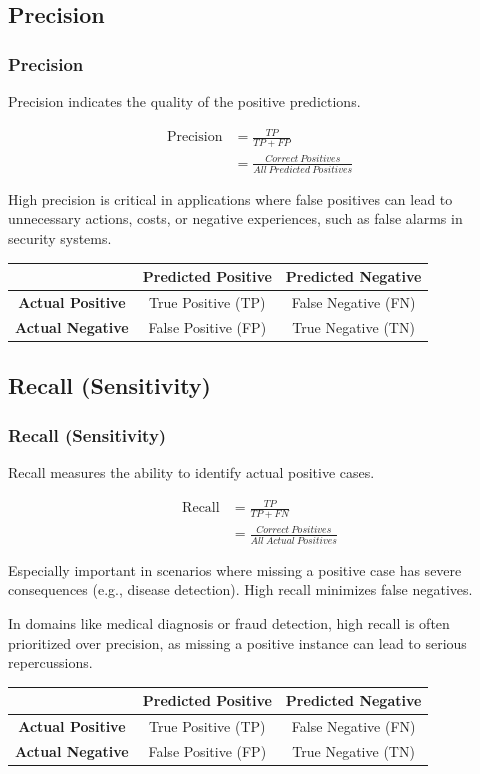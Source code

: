 \documentclass[aspectratio=169]{beamer} %
\begin{document}
	\subsection{Precision}
	\begin{frame}
		\frametitle{Precision}
		Precision indicates the quality of the positive predictions.

		\begin{align*}
			\mathrm{Precision} &= \frac{TP}{TP+FP} \\
								&= \frac{Correct~Positives}{All~Predicted~Positives}
		\end{align*}

		High precision is critical in applications where false positives can lead to unnecessary actions, costs, or negative experiences, such as false alarms in security systems.

		\begin{center}
			\begin{tabular}{|c|c|c|}
				\hline
				& \textbf{Predicted Positive} & \textbf{Predicted Negative} \\
				\hline
				\textbf{Actual Positive} & True Positive (TP) & False Negative (FN) \\
				\hline
				\textbf{Actual Negative} & False Positive (FP) & True Negative (TN) \\
				\hline
			\end{tabular}
		\end{center}
	\end{frame}

	\subsection{Recall (Sensitivity)}
	\begin{frame}
		\frametitle{Recall (Sensitivity)}
		Recall measures the ability to identify actual positive cases.

		\begin{align*}
			\mathrm{Recall} &= \frac{TP}{TP+FN} \\
								&= \frac{Correct~Positives}{All~Actual~Positives}
		\end{align*}

		Especially important in scenarios where missing a positive case has severe consequences (e.g., disease detection). High recall minimizes false negatives.

		In domains like medical diagnosis or fraud detection, high recall is often prioritized over precision, as missing a positive instance can lead to serious repercussions.

		\begin{center}
			\begin{tabular}{|c|c|c|}
				\hline
				& \textbf{Predicted Positive} & \textbf{Predicted Negative} \\
				\hline
				\textbf{Actual Positive} & True Positive (TP) & False Negative (FN) \\
				\hline
				\textbf{Actual Negative} & False Positive (FP) & True Negative (TN) \\
				\hline
			\end{tabular}
		\end{center}
	\end{frame}
\end{document}
